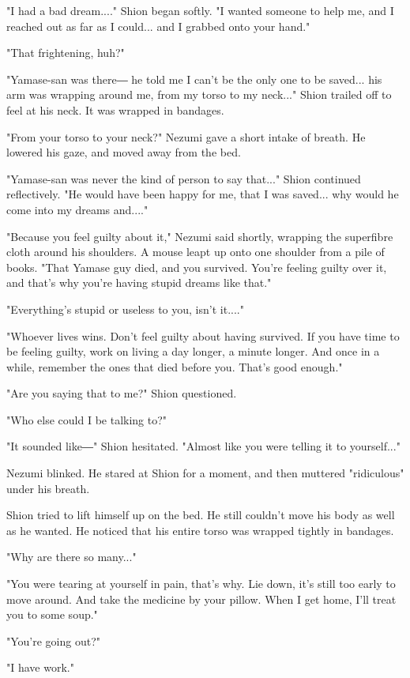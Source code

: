 "I had a bad dream...." Shion began softly. "I wanted someone to help
me, and I reached out as far as I could... and I grabbed onto your
hand."

"That frightening, huh?"

"Yamase-san was there― he told me I can't be the only one to be saved...
his arm was wrapping around me, from my torso to my neck..." Shion
trailed off to feel at his neck. It was wrapped in bandages.

"From your torso to your neck?" Nezumi gave a short intake of breath. He
lowered his gaze, and moved away from the bed.

"Yamase-san was never the kind of person to say that..." Shion continued
reflectively. "He would have been happy for me, that I was saved... why
would he come into my dreams and...."

"Because you feel guilty about it," Nezumi said shortly, wrapping the
superfibre cloth around his shoulders. A mouse leapt up onto one
shoulder from a pile of books. "That Yamase guy died, and you survived.
You're feeling guilty over it, and that's why you're having stupid
dreams like that."

"Everything's stupid or useless to you, isn't it...."~

"Whoever lives wins. Don't feel guilty about having survived. If you
have time to be feeling guilty, work on living a day longer, a minute
longer. And once in a while, remember the ones that died before you.
That's good enough."

"Are you saying that to me?" Shion questioned.

"Who else could I be talking to?"

"It sounded like―" Shion hesitated. "Almost like you were telling it to
yourself..."

Nezumi blinked. He stared at Shion for a moment, and then muttered
"ridiculous" under his breath.~

Shion tried to lift himself up on the bed. He still couldn't move his
body as well as he wanted. He noticed that his entire torso was wrapped
tightly in bandages.

"Why are there so many..."

"You were tearing at yourself in pain, that's why. Lie down, it's still
too early to move around. And take the medicine by your pillow. When I
get home, I'll treat you to some soup."

"You're going out?"

"I have work."

